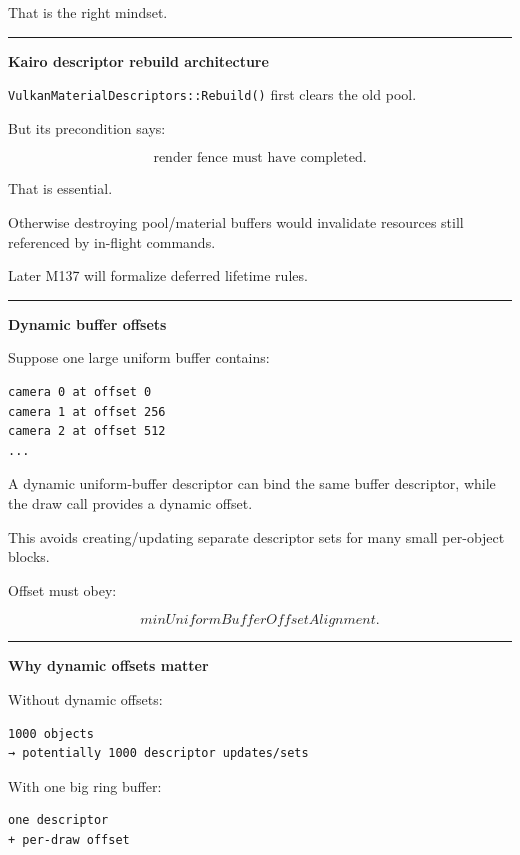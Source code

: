 That is the right mindset.

\begin{center}\rule{0.5\linewidth}{0.5pt}\end{center}

\textbf{Kairo descriptor rebuild architecture}

\texttt{VulkanMaterialDescriptors::Rebuild()} first clears the old pool.

But its precondition says:

\[
\boxed{
\text{render fence must have completed}.
}
\]

That is essential.

Otherwise destroying pool/material buffers would invalidate resources still referenced by in-flight commands.

Later M137 will formalize deferred lifetime rules.

\begin{center}\rule{0.5\linewidth}{0.5pt}\end{center}

\textbf{Dynamic buffer offsets}

Suppose one large uniform buffer contains:

\protect{}\label{p11-dyn-ubo}%
\begin{verbatim}
camera 0 at offset 0
camera 1 at offset 256
camera 2 at offset 512
...
\end{verbatim}

A dynamic uniform-buffer descriptor can bind the same buffer descriptor, while the draw call provides a dynamic offset.

This avoids creating/updating separate descriptor sets for many small per-object blocks.

Offset must obey:

\[
minUniformBufferOffsetAlignment.
\]

\begin{center}\rule{0.5\linewidth}{0.5pt}\end{center}

\textbf{Why dynamic offsets matter}

Without dynamic offsets:

\begin{verbatim}
1000 objects
→ potentially 1000 descriptor updates/sets
\end{verbatim}

With one big ring buffer:

\begin{verbatim}
one descriptor
+ per-draw offset
\end{verbatim}

